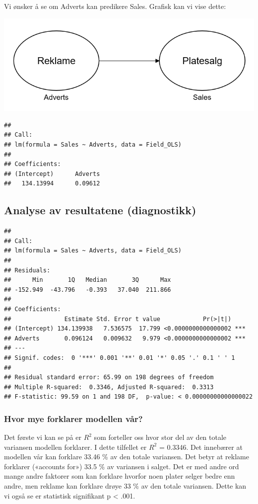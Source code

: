 \documentclass[
]{article}
\begin{document}
Vi ønsker å se om Adverts kan predikere Sales. Grafisk kan vi vise
dette:

\includegraphics{OLS1.png}

\begin{verbatim}
## 
## Call:
## lm(formula = Sales ~ Adverts, data = Field_OLS)
## 
## Coefficients:
## (Intercept)      Adverts  
##   134.13994      0.09612
\end{verbatim}

\hypertarget{analyse-av-resultatene-diagnostikk}{%
\subsection{Analyse av resultatene
(diagnostikk)}\label{analyse-av-resultatene-diagnostikk}}

\begin{verbatim}
## 
## Call:
## lm(formula = Sales ~ Adverts, data = Field_OLS)
## 
## Residuals:
##      Min       1Q   Median       3Q      Max 
## -152.949  -43.796   -0.393   37.040  211.866 
## 
## Coefficients:
##               Estimate Std. Error t value            Pr(>|t|)    
## (Intercept) 134.139938   7.536575  17.799 <0.0000000000000002 ***
## Adverts       0.096124   0.009632   9.979 <0.0000000000000002 ***
## ---
## Signif. codes:  0 '***' 0.001 '**' 0.01 '*' 0.05 '.' 0.1 ' ' 1
## 
## Residual standard error: 65.99 on 198 degrees of freedom
## Multiple R-squared:  0.3346, Adjusted R-squared:  0.3313 
## F-statistic: 99.59 on 1 and 198 DF,  p-value: < 0.00000000000000022
\end{verbatim}

\hypertarget{hvor-mye-forklarer-modellen-vuxe5r}{%
\subsubsection{Hvor mye forklarer modellen
vår?}\label{hvor-mye-forklarer-modellen-vuxe5r}}

Det første vi kan se på er \(R^{2}\) som forteller oss hvor stor del av
den totale variansen modellen forklarer. I dette tilfellet er \(R^{2}\)
= 0.3346. Det innebærer at modellen vår kan forklare 33.46 \% av den
totale variansen. Det betyr at reklame forklarer («accounts for») 33.5
\% av variansen i salget. Det er med andre ord mange andre faktorer som
kan forklare hvorfor noen plater selger bedre enn andre, men reklame kan
forklare drøye 33 \% av den totale variansen. Dette kan vi også se er
statistisk signifikant p \textless{} .001.
\end{document}
